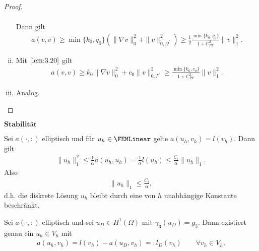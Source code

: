 \begin{proof}
\begin{enumerate}[i)]
\begin{eqnarray*}
        \end{eqnarray*}
        Dann gilt
        \begin{eqnarray*}
                a(v, v)
            \ge \min\{k_0, q_0\} (\|\nabla v\|_0^2 + \|v\|_{0,\Omega^\prime}^2)
            \ge \frac{1}{2} \frac{\min\{k_0, q_0\}}{1 + C_{PF}^2} \|v\|_1^2.
        \end{eqnarray*}
      \item
        Mit $\eqref{lem:3.20}$ gilt
        \begin{eqnarray*}
                a(v, v)
            \ge k_0 \|\nabla v\|_0^2 + c_0 \|v\|_{0,\Gamma^\prime}^2
            \ge \frac{\min\{k_0, c_0\}}{1 + C_{PF}^2} \|v\|_1^2.
        \end{eqnarray*}
      \item
        Analog.
    \end{enumerate}
\end{proof}


$\textbf{Stabilität}$

Sei $a(\cdot, :)$ elliptisch und für $u_h\in \FEMLinear$ gelte
$a(u_h, v_h) = l(v_h)$. Dann gilt
\begin{eqnarray*}
    \|u_h\|_1^2 \le \frac{1}{\alpha} a(u_h, u_h) = \frac{1}{\alpha} l(u_h)
    \le \frac{C_l}{\alpha} \|u_h\|_1.
\end{eqnarray*}
Also
\begin{eqnarray*}
    \|u_h\|_1 \le \frac{C_l}{\alpha},
\end{eqnarray*}
d.h. die diskrete Lösung $u_h$ bleibt durch eine von $h$ unabhängige Konstante beschränkt.


\begin{Satz}
    \label{satz:3.25}
    Sei $a(\cdot, :)$ elliptisch und sei $u_D\in H^1(\Omega)$ mit
    $\gamma_3(u_D) = g_3$. Dann existiert genau ein $u_h\in V_h$ mit
    \begin{eqnarray*}
        a(u_h, v_h) = l(v_h) - a(u_D, v_h) =: l_D(v_h)
        \qquad \forall v_h\in V_h.
    \end{eqnarray*}
\end{Satz}


